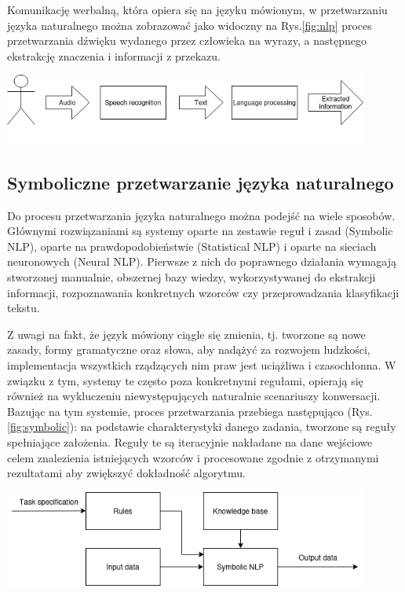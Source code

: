 Komunikację werbalną, która opiera się na języku mówionym, w przetwarzaniu języka naturalnego można zobrazować jako widoczny na Rys.\ref{fig:nlp} proces przetwarzania dźwięku wydanego przez człowieka na wyrazy, a następnego ekstrakcję znaczenia i informacji z przekazu.

\begin{center}
    \includegraphics[width=12cm]{files/nlp.png}
    \label{fig:nlp}
\end{center}


\subsection{Symboliczne przetwarzanie języka naturalnego}
\label{subsec:symbolic}

Do procesu przetwarzania języka naturalnego można podejść na wiele sposobów. Głównymi rozwiązaniami są systemy oparte na zestawie reguł i zasad (Symbolic NLP), oparte na prawdopodobieństwie (Statistical NLP) i oparte na sieciach neuronowych (Neural NLP). Pierwsze z nich do poprawnego działania wymagają stworzonej manualnie, obszernej bazy wiedzy, wykorzystywanej do ekstrakcji informacji, rozpoznawania konkretnych wzorców czy przeprowadzania klasyfikacji tekstu. 

Z uwagi na fakt, że język mówiony ciągle się zmienia, tj. tworzone są nowe zasady, formy gramatyczne oraz słowa, aby nadążyć za rozwojem ludzkości, implementacja wszystkich rządzących nim praw jest uciążliwa i czasochłonna. W związku z tym, systemy te często poza konkretnymi regułami, opierają się również na wykluczeniu niewystępujących naturalnie scenariuszy konwersacji. Bazując na tym systemie, proces przetwarzania przebiega następująco (Rys. \ref{fig:symbolic}): na podstawie charakterystyki danego zadania, tworzone są reguły spełniające założenia. Reguły te są iteracyjnie nakładane na dane wejściowe celem znalezienia istniejących wzorców i procesowane zgodnie z otrzymanymi rezultatami aby zwiększyć dokładność algorytmu. 

\begin{center}
    \includegraphics[width=12cm]{files/symbolic.png}
    \label{fig:symbolic}
\end{center}

